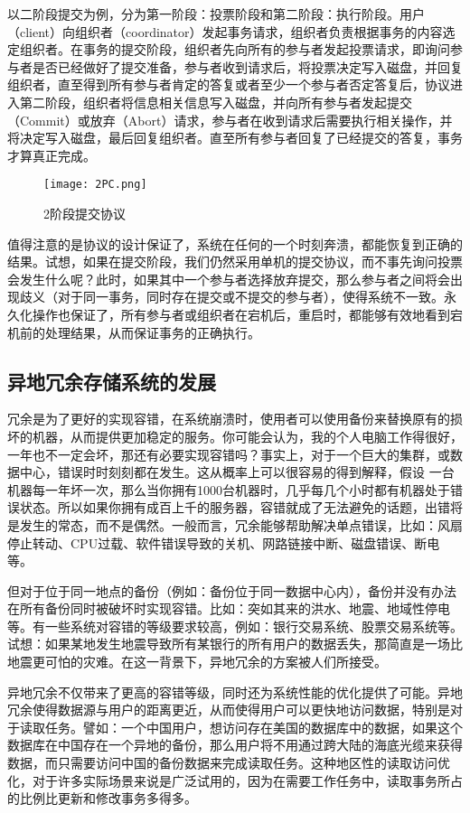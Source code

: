   以二阶段提交为例，分为第一阶段：投票阶段和第二阶段：执行阶段。用户（client）向组织者（coordinator）发起事务请求，组织者负责根据事务的内容选定组织者。在事务的提交阶段，组织者先向所有的参与者发起投票请求，即询问参与者是否已经做好了提交准备，参与者收到请求后，将投票决定写入磁盘，并回复组织者，直至得到所有参与者肯定的答复或者至少一个参与者否定答复后，协议进入第二阶段，组织者将信息相关信息写入磁盘，并向所有参与者发起提交（Commit）或放弃（Abort）请求，参与者在收到请求后需要执行相关操作，并将决定写入磁盘，最后回复组织者。直至所有参与者回复了已经提交的答复，事务才算真正完成。
  
  \begin{figure}[htb]
  \centering
  \texttt{[image: 2PC.png]}
  \caption{2阶段提交协议}
  \label{fig:badge}
\end{figure}

  值得注意的是协议的设计保证了，系统在任何的一个时刻奔溃，都能恢复到正确的结果。试想，如果在提交阶段，我们仍然采用单机的提交协议，而不事先询问投票会发生什么呢？此时，如果其中一个参与者选择放弃提交，那么参与者之间将会出现歧义（对于同一事务，同时存在提交或不提交的参与者），使得系统不一致。永久化操作也保证了，所有参与者或组织者在宕机后，重启时，都能够有效地看到宕机前的处理结果，从而保证事务的正确执行。



\subsection{异地冗余存储系统的发展}
  冗余是为了更好的实现容错，在系统崩溃时，使用者可以使用备份来替换原有的损坏的机器，从而提供更加稳定的服务。\cite{Spanner}你可能会认为，我的个人电脑工作得很好，一年也不一定会坏，那还有必要实现容错吗？事实上，对于一个巨大的集群，或数据中心，错误时时刻刻都在发生。这从概率上可以很容易的得到解释，假设
  一台机器每一年坏一次，那么当你拥有1000台机器时，几乎每几个小时都有机器处于错误状态。所以如果你拥有成百上千的服务器，容错就成了无法避免的话题，出错将是发生的常态，而不是偶然。一般而言，冗余能够帮助解决单点错误，比如：风扇停止转动、CPU过载、软件错误导致的关机、网路链接中断、磁盘错误、断电等。


  但对于位于同一地点的备份（例如：备份位于同一数据中心内），备份并没有办法在所有备份同时被破坏时实现容错。比如：突如其来的洪水、地震、地域性停电等。有一些系统对容错的等级要求较高，例如：银行交易系统、股票交易系统等。试想：如果某地发生地震导致所有某银行的所有用户的数据丢失，那简直是一场比地震更可怕的灾难。在这一背景下，异地冗余的方案被人们所接受。

  异地冗余不仅带来了更高的容错等级，同时还为系统性能的优化提供了可能。异地冗余使得数据源与用户的距离更近，从而使得用户可以更快地访问数据，特别是对于读取任务。譬如：一个中国用户，想访问存在美国的数据库中的数据，如果这个数据库在中国存在一个异地的备份，那么用户将不用通过跨大陆的海底光缆来获得数据，而只需要访问中国的备份数据来完成读取任务。这种地区性的读取访问优化，对于许多实际场景来说是广泛试用的，因为在需要工作任务中，读取事务所占的比例比更新和修改事务多得多。
 
